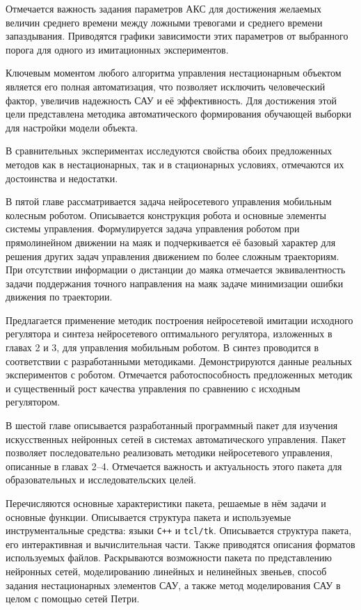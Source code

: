 Отмечается важность задания параметров АКС для достижения желаемых
величин среднего времени между ложными тревогами и среднего времени
запаздывания.  Приводятся графики зависимости этих параметров от
выбранного порога для одного из имитационных экспериментов.

Ключевым моментом любого алгоритма управления нестационарным объектом
является его полная автоматизация, что позволяет исключить
человеческий фактор, увеличив надежность САУ и её эффективность.  Для
достижения этой цели представлена методика автоматического
формирования обучающей выборки для настройки модели объекта.

В сравнительных экспериментах исследуются свойства обоих предложенных
методов как в нестационарных, так и в стационарных условиях,
отмечаются их достоинства и недостатки.


В пятой главе рассматривается задача нейросетевого управления
мобильным колесным роботом.  Описывается конструкция робота и основные
элементы системы управления.  Формулируется задача управления роботом
при прямолинейном движении на маяк и подчеркивается её базовый
характер для решения других задач управления движением по более
сложным траекториям.  При отсутствии информации о дистанции до маяка
отмечается эквивалентность задачи поддержания точного направления на
маяк задаче минимизации ошибки движения по траектории.

Предлагается применение методик построения нейросетевой имитации
исходного регулятора и синтеза нейросетевого оптимального регулятора,
изложенных в главах 2 и 3, для управления мобильным роботом.  В синтез
проводится в соответствии с разработанными методиками.
Демонстрируются данные реальных экспериментов с роботом.  Отмечается
работоспособность предложенных методик и существенный рост качества
управления по сравнению с исходным регулятором.


В шестой главе описывается разработанный программный пакет для
изучения искусственных нейронных сетей в системах автоматического
управления.  Пакет позволяет последовательно реализовать методики
нейросетевого управления, описанные в главах 2--4.  Отмечается
важность и актуальность этого пакета для образовательных и
исследовательских целей.

Перечисляются основные характеристики пакета, решаемые в нём задачи и
основные функции.  Описывается структура пакета и используемые
инструментальные средства: языки {\tt C++} и {\tt tcl/tk}.
Описывается структура пакета, его интерактивная и вычислительная
части.  Также приводятся описания форматов используемых файлов.
Раскрываются возможности пакета по представлению нейронных сетей,
моделированию линейных и нелинейных звеньев, способ задания
нестационарных элементов САУ, а также метод моделирования САУ в целом
с помощью сетей Петри.

